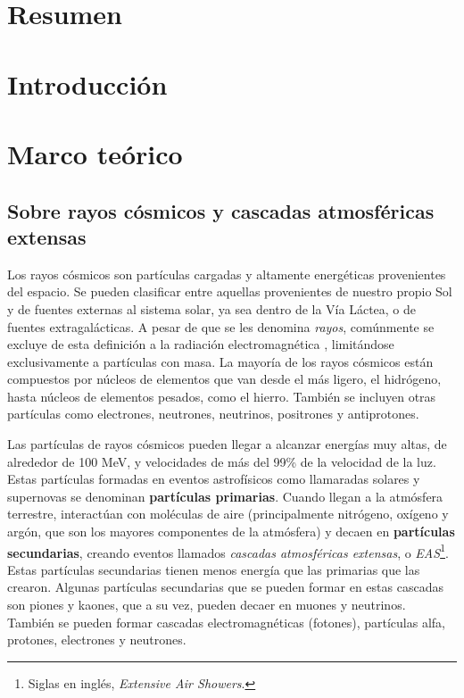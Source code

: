 \documentclass[12pt]{report}
\begin{document}

\section*{Resumen}


\section*{Introducción}








\section*{Marco teórico}

\subsection*{Sobre rayos cósmicos y cascadas atmosféricas extensas}

\normalsize

Los rayos cósmicos son partículas cargadas y altamente energéticas provenientes del espacio. Se pueden clasificar entre aquellas provenientes de nuestro propio Sol y de fuentes externas al sistema solar, ya sea dentro de la Vía Láctea, o de fuentes extragalácticas. \cite{weatherMoldwin} A pesar de que se les denomina \textit{rayos}, comúnmente se excluye de esta definición a la radiación electromagnética \cite{NASACosmicopia}, limitándose exclusivamente a partículas con masa. La mayoría de los rayos cósmicos están compuestos por núcleos de elementos que van desde el más ligero, el hidrógeno, hasta núcleos de elementos pesados, como el hierro. También se incluyen otras partículas como electrones, neutrones, neutrinos, positrones y antiprotones. \cite{NASAImagine}

Las partículas de rayos cósmicos pueden llegar a alcanzar energías muy altas, de alrededor de 100 MeV, y velocidades de más del 99\% de la velocidad de la luz. \cite{weatherMoldwin} Estas partículas formadas en eventos astrofísicos como llamaradas solares y supernovas se denominan \textbf{partículas primarias}. Cuando llegan a la atmósfera terrestre, interactúan con moléculas de aire (principalmente nitrógeno, oxígeno y argón, que son los mayores componentes de la atmósfera) y decaen en \textbf{partículas secundarias}, creando eventos llamados \textit{cascadas atmosféricas extensas}, o \textit{EAS}\footnote{Siglas en inglés, \textit{Extensive Air Showers}.}. Estas partículas secundarias tienen menos energía que las primarias que las crearon. Algunas partículas secundarias que se pueden formar en estas cascadas son piones y kaones, que a su vez, pueden decaer en muones y neutrinos. \cite{EAS} También se pueden formar cascadas electromagnéticas (fotones), partículas alfa, protones, electrones y neutrones.
\end{document}
